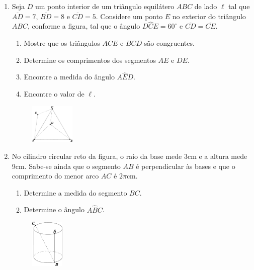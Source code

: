 \documentclass[a4paper,5pt]{amsbook}
\begin{document}
\vspace{1cm}
\begin{enumerate}
    \item Seja $D$ um ponto interior de um tri\^angulo equil\'atero $ABC$ de lado
        $\ell$ tal que $\overline{AD} = 7$, $\overline{BD} = 8$ e
        $\overline{CD} = 5$. Considere um ponto $E$ no exterior do tri\^angulo
        $ABC$, conforme a figura, tal que o \^angulo $D\hat{C}E = 60^\circ$ e
        $\overline{CD} = \overline{CE}$.
        \begin{enumerate}
            \vspace{0.3cm}
            \item Mostre que os tri\^angulos $ACE$ e $BCD$ s\~ao congruentes.
            \vspace{0.3cm}
            \item Determine os comprimentos dos segmentos $AE$ e $DE$.
            \vspace{0.3cm}
            \item Encontre a medida do \^angulo $A\hat{E}D$.
            \vspace{0.3cm}
            \item Encontre o valor de $\ell$.
        \end{enumerate}
        \begin{figure}[!h]
            \centering
            \includegraphics[width=0.2\textwidth]{fig02-1.pdf}
        \end{figure}

    \vspace{0.5cm}
    \item No cilindro circular reto da figura, o raio da base mede 3cm e a
        altura mede 9cm. Sabe-se ainda que o segmento $AB$ \'e perpendicular \`as
        bases e que o comprimento do menor arco $AC$ \'e $2\pi$cm.
        \begin{enumerate}
            \vspace{0.3cm}
            \item Determine a medida do segmento $BC$.
            \vspace{0.3cm}
            \item Determine o \^angulo $A\hat{B}C$.
        \end{enumerate}
        \begin{figure}[!h]
            \centering
            \includegraphics[width=0.15\textwidth]{fig02-2.pdf}
        \end{figure}


\end{enumerate}
\end{document}
